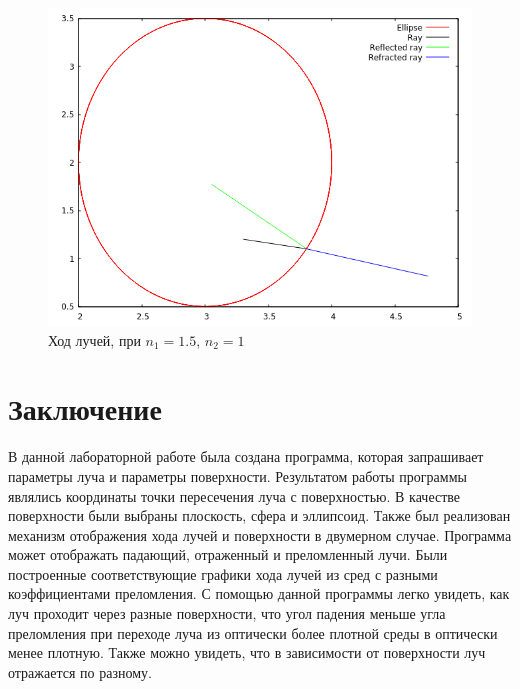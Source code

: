 {	\begin{figure}[H]
		\includegraphics[width=0.7\pagewidth]{ell_intersect4}
		\caption{Ход лучей, при $n_1 = 1.5$, $n_2 = 1$}
		\label{ell_intersect4}
	\end{figure}
}

\newpage

\titleformat{\section}{\large\bfseries\centering}{\thesection}{0.5em}{\MakeUppercase}
\titleformat{\subsection}[block]{\bfseries\hspace{1em}}{\thesubsection}{0.5em}{}

\section*{Заключение}{
	В данной лабораторной работе была создана программа, которая запрашивает параметры луча и параметры поверхности. Результатом работы программы являлись координаты точки пересечения луча с поверхностью. В качестве поверхности были выбраны плоскость, сфера и эллипсоид. Также был реализован механизм отображения хода лучей и поверхности в двумерном случае. Программа может отображать падающий, отраженный и преломленный лучи. Были построенные соответствующие графики хода лучей из сред с разными коэффициентами преломления. С помощью данной программы легко увидеть, как луч проходит через разные поверхности, что угол падения меньше угла преломления при переходе луча из оптически более плотной среды в оптически менее плотную. Также можно увидеть, что в зависимости от поверхности луч отражается по разному.
}

